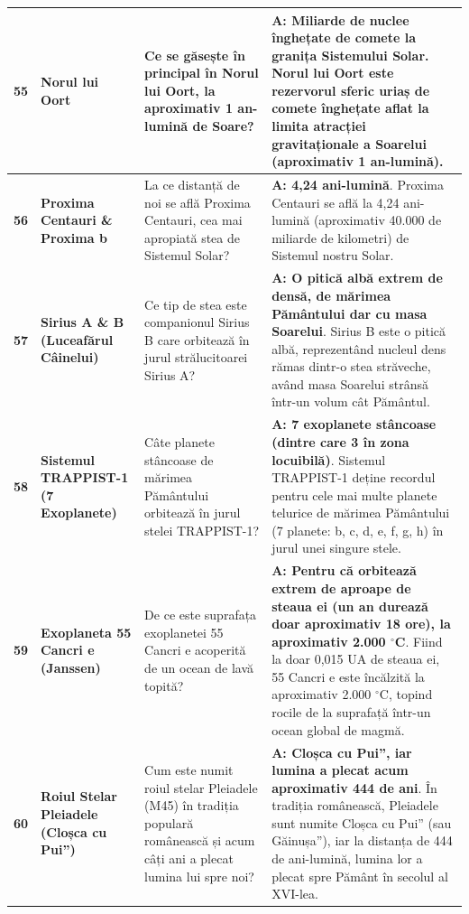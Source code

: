 \begin{longtable}{@{}r >{\raggedright\arraybackslash}p{2.7cm} >{\raggedright\arraybackslash}p{4.8cm} >{\raggedright\arraybackslash}p{6.5cm}@{}}
\textbf{55} & \textbf{Norul lui Oort} & Ce se găsește în principal în Norul lui Oort, la aproximativ 1 an-lumină de Soare? & \textbf{A: Miliarde de nuclee înghețate de comete la granița Sistemului Solar}. {\footnotesize Norul lui Oort este rezervorul sferic uriaș de comete înghețate aflat la limita atracției gravitaționale a Soarelui (aproximativ 1 an-lumină).} \\ \midrule
\textbf{56} & \textbf{Proxima Centauri \& Proxima b} & La ce distanță de noi se află Proxima Centauri, cea mai apropiată stea de Sistemul Solar? & \textbf{A: 4,24 ani-lumină}. {\footnotesize Proxima Centauri se află la 4,24 ani-lumină (aproximativ 40.000 de miliarde de kilometri) de Sistemul nostru Solar.} \\ \midrule
\textbf{57} & \textbf{Sirius A \& B (Luceafărul Câinelui)} & Ce tip de stea este companionul Sirius B care orbitează în jurul strălucitoarei Sirius A? & \textbf{A: O pitică albă extrem de densă, de mărimea Pământului dar cu masa Soarelui}. {\footnotesize Sirius B este o pitică albă, reprezentând nucleul dens rămas dintr-o stea străveche, având masa Soarelui strânsă într-un volum cât Pământul.} \\ \midrule
\textbf{58} & \textbf{Sistemul TRAPPIST-1 (7 Exoplanete)} & Câte planete stâncoase de mărimea Pământului orbitează în jurul stelei TRAPPIST-1? & \textbf{A: 7 exoplanete stâncoase (dintre care 3 în zona locuibilă)}. {\footnotesize Sistemul TRAPPIST-1 deține recordul pentru cele mai multe planete telurice de mărimea Pământului (7 planete: b, c, d, e, f, g, h) în jurul unei singure stele.} \\ \midrule
\textbf{59} & \textbf{Exoplaneta 55 Cancri e (Janssen)} & De ce este suprafața exoplanetei 55 Cancri e acoperită de un ocean de lavă topită? & \textbf{A: Pentru că orbitează extrem de aproape de steaua ei (un an durează doar aproximativ 18 ore), la aproximativ 2.000 $^\circ$C}. {\footnotesize Fiind la doar 0,015 UA de steaua ei, 55 Cancri e este încălzită la aproximativ 2.000 $^\circ$C, topind rocile de la suprafață într-un ocean global de magmă.} \\ \midrule
\textbf{60} & \textbf{Roiul Stelar Pleiadele (\quotedblbase{}Cloșca cu Pui\textquotedblright{})} & Cum este numit roiul stelar Pleiadele (M45) în tradiția populară românească și acum câți ani a plecat lumina lui spre noi? & \textbf{A: \quotedblbase{}Cloșca cu Pui\textquotedblright{}, iar lumina a plecat acum aproximativ 444 de ani}. {\footnotesize În tradiția românească, Pleiadele sunt numite \quotedblbase{}Cloșca cu Pui\textquotedblright{} (sau \quotedblbase{}Găinușa\textquotedblright{}), iar la distanța de 444 de ani-lumină, lumina lor a plecat spre Pământ în secolul al XVI-lea.} \\ \midrule

\end{longtable}
